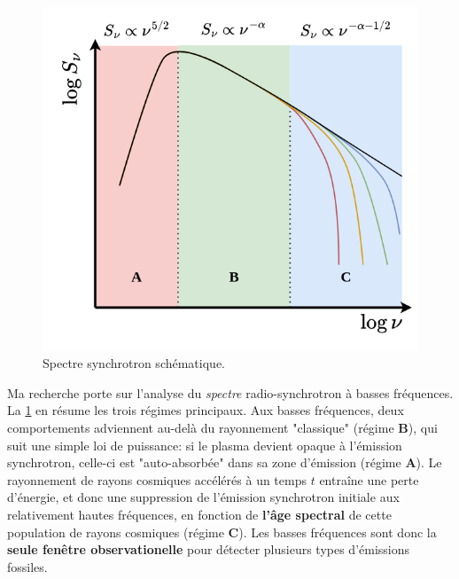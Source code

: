 \begin{figure}\centering
	\vspace{-2.5\baselineskip}
	\includegraphics[width=\linewidth]{synchrotron.drawio.png}
	\caption{Spectre synchrotron sch\'ematique.\vspace{-0.8\baselineskip}} \label{fig.synchrotron}
	\vspace{-0.4\baselineskip}
\end{figure}

\pg
Ma recherche porte sur l'analyse du \textit{spectre} radio-synchrotron \`a basses fr\'equences. La \cref{fig.synchrotron} en r\'esume les trois r\'egimes principaux. Aux basses fr\'equences, deux comportements adviennent au-del\`a du rayonnement "classique" (r\'egime \textbf{B}), qui suit une simple loi de puissance: si le plasma devient opaque \`a l'\'emission synchrotron, celle-ci est "auto-absorb\'ee" dans sa zone d'\'emission (r\'egime \textbf{A}). Le rayonnement de rayons cosmiques acc\'el\'er\'es \`a un temps $t$ entra\^ine une perte d'\'energie, 
et donc une suppression de l'\'emission synchrotron initiale aux relativement hautes fr\'equences, en fonction de \textbf{l'\^age spectral} de cette population de rayons cosmiques (r\'egime \textbf{C}). Les basses fr\'equences sont donc la \textbf{seule fen\^etre observationelle} pour d\'etecter plusieurs types d'\'emissions fossiles.%



